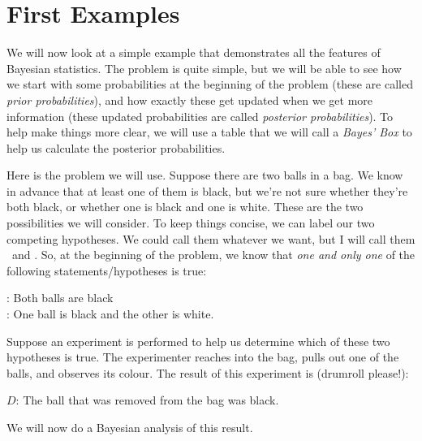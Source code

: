 \chapter{First Examples}
We will now look at a simple example that demonstrates all the features of
Bayesian statistics. The problem is quite simple, but we will be able to see
how we start with some probabilities at the beginning of the problem (these are
called {\it prior probabilities}), and how exactly these get updated
when we get more information (these updated probabilities are called
{\it posterior probabilities}). To help make things more clear, we will
use a table that we will call a {\it Bayes' Box} to help us calculate the
posterior probabilities.

Here is the problem we will use. Suppose there are two balls in a bag. We know in advance
that at least one of them is black, but we're not sure whether they're both
black, or whether one is black and one is white. These are the two possibilities
we will consider.
To keep things concise, we
can label our two competing hypotheses. We could call them whatever we want,
but I will call them \bb~and \bw. So, at the beginning of the problem, we know
that {\it one and only one} of the following statements/hypotheses is true:\\
\begin{framed}
\bb: Both balls are black\\
\bw: One ball is black and the other is white.
\end{framed}
Suppose an experiment is performed to help us determine
which of these two hypotheses is
true. The experimenter reaches into the bag, pulls out one of the balls, and
observes its colour. The result of this experiment is (drumroll please!):
\begin{framed}
$D$: The ball that was removed from the bag was black.
\end{framed}
We will now do a Bayesian analysis of this result.

